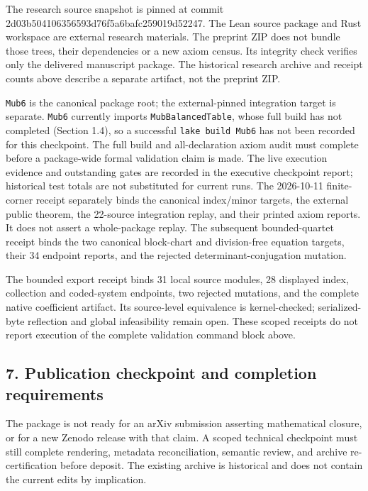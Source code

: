 \documentclass[
]{article}
\begin{document}
The research source snapshot is pinned at
commit
2d03b504106356593d76f5a6bafc259019d52247. The
Lean
source package and
Rust
workspace are external research materials. The preprint ZIP does not
bundle those trees, their dependencies or a new axiom census. Its
integrity check verifies only the delivered manuscript package. The
historical research archive and receipt counts above describe a separate
artifact, not the preprint ZIP.

\nolinkurl{Mub6} is the canonical package root; the external-pinned
integration target is separate. \nolinkurl{Mub6} currently imports
\nolinkurl{MubBalancedTable}, whose full build has not completed
(Section 1.4), so a successful \nolinkurl{lake build Mub6} has not been
recorded for this checkpoint. The full build and all-declaration axiom
audit must complete before a package-wide formal validation claim is
made. The live execution evidence and outstanding gates are recorded in
the executive checkpoint report; historical test totals are not
substituted for current runs. The 2026-10-11 finite-corner receipt
separately binds the canonical index/minor targets, the external public
theorem, the 22-source integration replay, and their printed axiom
reports. It does not assert a whole-package replay. The subsequent
bounded-quartet receipt binds the two canonical block-chart and
division-free equation targets, their 34 endpoint reports, and the
rejected determinant-conjugation mutation.

The bounded export receipt binds 31 local source modules, 28 displayed
index, collection and coded-system endpoints, two rejected mutations,
and the complete native coefficient artifact. Its source-level
equivalence is kernel-checked; serialized-byte reflection and global
infeasibility remain open. These scoped receipts do not report execution
of the complete validation command block above.

\subsection{7. Publication checkpoint and completion
requirements}\label{publication-checkpoint-and-completion-requirements}

The package is not ready for an arXiv submission asserting mathematical
closure, or for a new Zenodo release with that claim. A scoped technical
checkpoint must still complete rendering, metadata reconciliation,
semantic review, and archive re-certification before deposit. The
existing archive is historical and does not contain the current edits by
implication.
\end{document}
